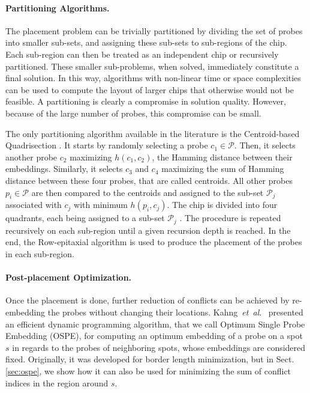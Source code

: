 \documentclass{llncs}
\newcommand{\ignore}[1]{}
\begin{document}
\ignore{
The ever growing number of probes on the latest microarrays and the properties of
the placement problem naturally suggest the use of partitioning strategies to reduce
the running time of the algorithms.
}

\paragraph{Partitioning Algorithms.}
The placement problem can be trivially partitioned by
dividing the set of probes into smaller sub-sets, and assigning these sub-sets to
sub-regions of the chip. Each sub-region can then be treated as an independent chip
or recursively partitioned. These smaller sub-problems, when solved, immediately
constitute a final solution. In this way, algorithms with non-linear time or space
complexities can be used to compute the layout of larger chips that otherwise would not
be feasible. A partitioning is clearly a compromise in solution quality. However,
because of the large number of probes, this compromise can be small.

The only partitioning algorithm available in the literature is the Centroid-based
Quadrisection \cite{KAHNG03B}. It starts by randomly selecting a probe
$c_1 \in \mathcal{P}$. Then, it selects another probe $c_2$ maximizing
$h(c_1,c_2)$, the Hamming distance between their embeddings. Similarly, it selects
$c_3$ and $c_4$ maximizing the sum of Hamming distance between these four probes,
that are called centroids. All other probes
$p_i \in \mathcal{P}$ are then compared to the centroids and assigned to the sub-set
$\mathcal{P}_j$ associated with $c_j$ with minimum $h(p_i,c_j)$. The chip is divided
into four quadrants, each being assigned to a sub-set $\mathcal{P}_j$ .
The procedure is repeated
recursively on each sub-region until a given recursion depth is reached. In the end,
the Row-epitaxial algorithm is used to produce the placement of the probes in each
sub-region.

\paragraph{Post-placement Optimization.}
Once the placement is done, further reduction of conflicts can be
achieved by re-embedding the probes without changing their locations.
Kahng~{\it et~al}.~\cite{KAHNG02} presented an efficient dynamic programming
algorithm, that we call Optimum Single Probe Embedding (OSPE), for computing an
optimum embedding of a probe on a spot $s$ in regards to the probes of
neighboring spots, whose embeddings are considered fixed.
Originally, it was developed for border length minimization, but
in Sect.\,\ref{sec:ospe}, we show how it can also be used for minimizing the
sum of conflict indices in the region around $s$.
\end{document}
